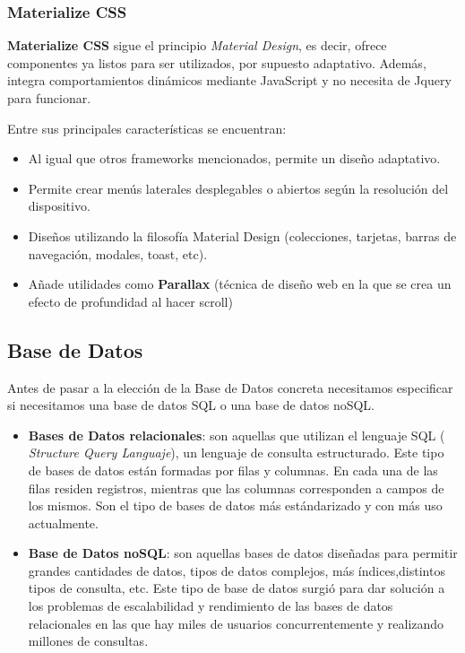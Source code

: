     \subsubsection{Materialize CSS}
    \textbf{Materialize CSS} \cite{materialize-css} sigue el principio \textit{Material Design},
    es decir, ofrece componentes ya listos para ser utilizados, por supuesto adaptativo.
    Además, integra comportamientos dinámicos mediante JavaScript y no necesita de Jquery para
    funcionar.

    Entre sus principales características se encuentran:
        
        \begin{itemize}
            \item Al igual que otros frameworks mencionados, permite un diseño adaptativo.
            \item Permite crear menús laterales desplegables o abiertos según la resolución
            del dispositivo.
            \item Diseños utilizando la filosofía Material Design (colecciones, tarjetas,
            barras de navegación, modales, toast, etc).
            \item Añade utilidades como \textbf{Parallax} (técnica de diseño web en la que se crea
            un efecto de profundidad al hacer scroll)
        \end{itemize}

\subsection{Base de Datos}
Antes de pasar a la elección de la Base de Datos concreta necesitamos especificar si
necesitamos una base de datos SQL o una base de datos noSQL. 
\begin{itemize}
    \item \textbf{Bases de Datos relacionales}: son aquellas que utilizan el lenguaje SQL (
    \textit{Structure Query Languaje}), un lenguaje de consulta estructurado. Este tipo de 
    bases de datos están formadas por filas y columnas. En cada una de las filas residen
    registros, mientras que las columnas corresponden a campos de los mismos. Son el tipo
    de bases de datos más estándarizado y con más uso actualmente.
    \item \textbf{Base de Datos noSQL}:  son aquellas bases de datos diseñadas para permitir
    grandes cantidades de datos, tipos de datos complejos, más índices,distintos tipos de
    consulta, etc. Este tipo de base de datos surgió para dar solución a los problemas de
    escalabilidad y rendimiento de las bases de datos relacionales en las que hay miles de
    usuarios concurrentemente y realizando millones de consultas.
\end{itemize}

